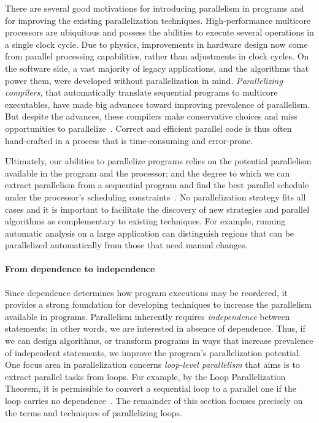 There are several good motivations for introducing parallelism in programs and for improving the existing parallelization techniques.
High-performance multicore processors are ubiquitous and possess the abilities to execute several operations in a single clock cycle.
Due to physics, improvements in hardware design now come from parallel processing capabilities, rather than adjustments in clock cycles.
On the software side, a vast majority of legacy applications, and the algorithms that power them, were developed without parallelization in mind.
\emph{Parallelizing compilers}, that automatically translate sequential programs to multicore executables, have made big advances toward improving prevalence of parallelism.
But despite the advances, these compilers make conservative choices and miss opportunities to parallelize~\cite{holewinski2012}.
Correct and efficient parallel code is thus often hand-crafted in a process that is time-consuming and error-prone.

Ultimately, our abilities to parallelize programs relies on the potential parallelism available in the program and the processor;
and the degree to which we can extract parallelism from a sequential program and find the best parallel schedule under the processor's scheduling constraints~\cite{alfred2007}.
No parallelization strategy fits all cases and it is important to facilitate the discovery of new strategies and parallel algorithms as complementary to existing techniques.
For example, running automatic analysis on a large application can distinguish regions that can be parallelized automatically from those that need manual changes.

\paragraph*{From dependence to independence}
Since dependence determines how program executions may be reordered, it provides a strong foundation for developing techniques to increase the parallelism available in programs.
Parallelism inherently requires \emph{independence} between statements;
in other words, we are interested in absence of dependence.
Thus, if we can design algorithms, or transform programs in ways that increase prevalence of independent statements, we improve the program's parallelization potential.
One focus area in parallelization concerns \emph{loop-level parallelism} that aims is to extract parallel tasks from loops.
For example, by the Loop Parallelization Theorem, it is permissible to convert a sequential loop to a parallel one if the loop carries no dependence~\cite[p. 82]{kennedy2001}.
The remainder of this section focuses precisely on the terms and techniques of parallelizing loops.

